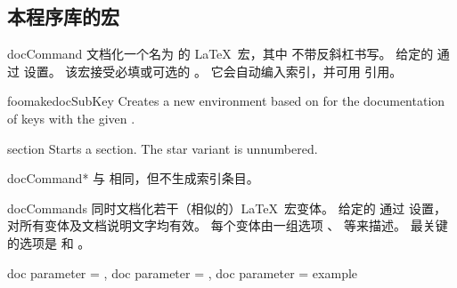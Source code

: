 \subsection{本程序库的宏}

\begin{docEnvironment}[doclang/environment content=command description,doc updated=2020-04-22]
    {docCommand}{}
  文档化一个名为  的 \LaTeX\ 宏，其中  不带反斜杠书写。
  给定的  通过  设置。
  该宏接受必填或可选的 。
  它会自动编入索引，并可用
   引用。
\begin{dispExample}
\begin{docCommand}{foomakedocSubKey}{}
  Creates a new environment  based on  for the
  documentation of keys with the given .
\end{docCommand}
\end{dispExample}
\begin{dispExample}
\begin{docCommand}[doc no index,color definition=blue]{section}%
    {\sarg{}}
  Starts a section. The star variant is unnumbered.
\end{docCommand}
\end{dispExample}
\end{docEnvironment}


\begin{docEnvironment}[doclang/environment content=command description,doc updated=2020-04-22]
    {docCommand*}{}
  与  相同，但不生成索引条目。
\end{docEnvironment}


\begin{docEnvironment}[doclang/environment content=command description,doc new=2020-04-22]
    {docCommands}{}
  同时文档化若干（相似的）\LaTeX\ 宏变体。
  给定的  通过  设置，对所有变体及文档说明文字均有效。
  每个变体由一组选项 、 等来描述。
  最关键的选项是  和 。
\begin{dispExample}
\begin{docCommands}[
    doc no index,  %
    doc name      = newtheorem
  ]
  {
    { doc parameter = \sarg{} },
    { doc parameter =  },
    { doc parameter =  }
  }
  example
\end{docCommands}
\end{dispExample}
\end{docEnvironment}



